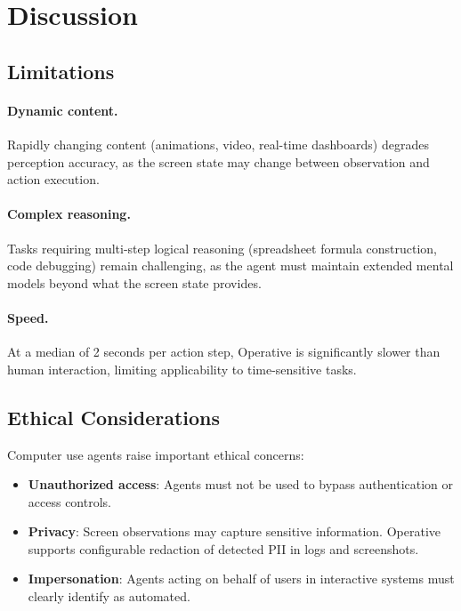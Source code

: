 \documentclass[11pt,twocolumn]{article}
\begin{document}
\section{Discussion}
\label{sec:discussion}

\subsection{Limitations}

\paragraph{Dynamic content.} Rapidly changing content (animations, video, real-time dashboards) degrades perception accuracy, as the screen state may change between observation and action execution.

\paragraph{Complex reasoning.} Tasks requiring multi-step logical reasoning (spreadsheet formula construction, code debugging) remain challenging, as the agent must maintain extended mental models beyond what the screen state provides.

\paragraph{Speed.} At a median of 2 seconds per action step, Operative is significantly slower than human interaction, limiting applicability to time-sensitive tasks.

\subsection{Ethical Considerations}

Computer use agents raise important ethical concerns:

\begin{itemize}[leftmargin=*]
    \item \textbf{Unauthorized access}: Agents must not be used to bypass authentication or access controls.
    \item \textbf{Privacy}: Screen observations may capture sensitive information. Operative supports configurable redaction of detected PII in logs and screenshots.
    \item \textbf{Impersonation}: Agents acting on behalf of users in interactive systems must clearly identify as automated.
\end{itemize}
\end{document}
